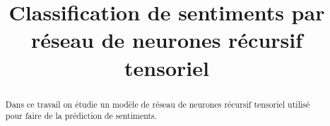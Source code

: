 \documentclass[conference]{IEEEtran}
\begin{document}
%
\title{Classification de sentiments par réseau de neurones récursif tensoriel }


\author{
\and
{}
}


% 








\maketitle


\begin{abstract}
Dans ce travail on étudie un modèle de réseau de neurones récursif tensoriel utilisé pour faire de la prédiction de sentiments.
\end{abstract}
\end{document}
